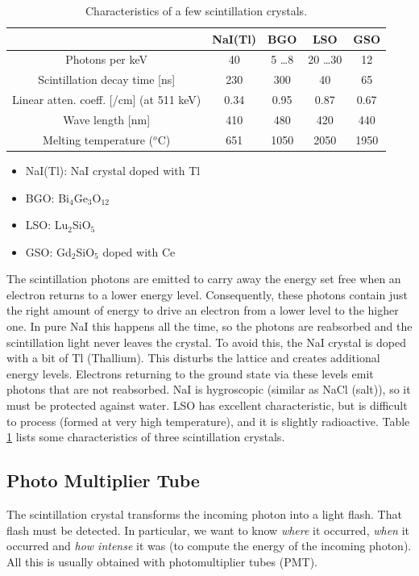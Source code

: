 \begin{table}
\centering
\caption{Characteristics of a few scintillation crystals.
\label{tab:crystals}}
\begin{tabular}{|c|c|c|c|c|}
\hline
       & NaI(Tl) &    BGO      & LSO      & GSO \\
\hline
Photons per keV                    
        &  40     & 5 \ldots 8  & 20 \ldots 30 &  12\\
Scintillation decay time [ns]
        & 230     &  300  & 40  & 65 \\
Linear atten. coeff. [/cm] (at 511 keV)
        & 0.34    & 0.95  & 0.87  & 0.67\\
 Wave length [nm]
        & 410     & 480   & 420 & 440 \\
Melting temperature ($^o$C)
        & 651 & 1050 & 2050 & 1950 \\
\hline
\end{tabular}
\begin{itemize}
\item NaI(Tl): NaI crystal doped with Tl
\item BGO: Bi$_4$Ge$_{3}$O$_{12}$
\item LSO: Lu$_2$SiO$_5$
\item GSO: Gd$_2$SiO$_5$ doped with Ce
\end{itemize}
\end{table}

The scintillation photons are emitted to carry away the energy set
free when an electron returns to a lower energy level. Consequently,
these photons contain just the right amount of energy to drive an
electron from a lower level to the higher one. In pure NaI this
happens all the time, so the photons are reabsorbed and the
scintillation light never leaves the crystal. To avoid this, the NaI
crystal is doped with a bit of Tl (Thallium). This disturbs the
lattice and creates additional energy levels. Electrons returning to
the ground state via these levels emit photons that are not
reabsorbed.  NaI is hygroscopic (similar as NaCl (salt)), so it must
be protected against water. LSO has excellent characteristic, but is
difficult to process (formed at very high temperature), and it is
slightly radioactive. Table \ref{tab:crystals} lists some
characteristics of three scintillation crystals.

\subsection{Photo Multiplier Tube}
The scintillation crystal transforms the incoming photon into a light flash.
That flash must be detected. In particular, we want to know {\em where} it
occurred, {\em when} it occurred and {\em how intense} it was (to compute the
energy of the incoming photon). All this is usually obtained with
photomultiplier tubes (PMT).

